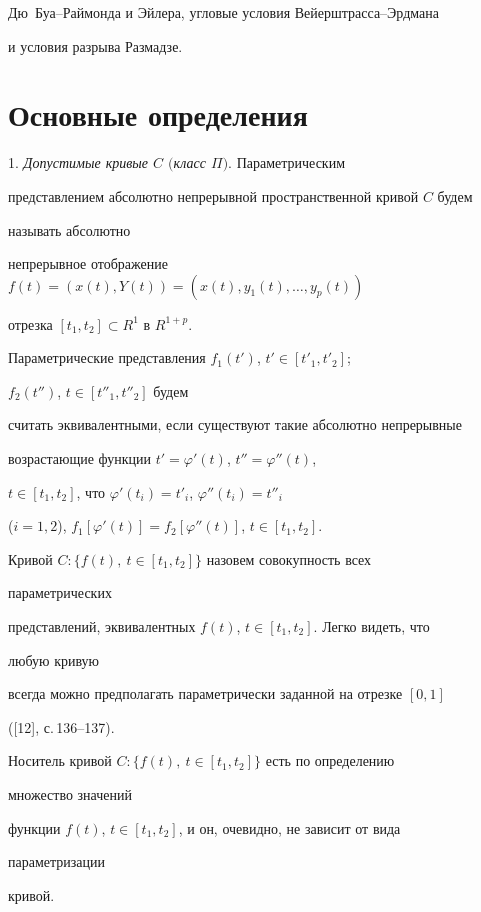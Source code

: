 Дю~Буа--Раймонда и Эйлера, угловые условия Вейерштрасса--Эрдмана 


и условия разрыва Размадзе. 


 


\section{Основные определения} 


 


1. {\it Допустимые кривые $C$ $($класс $\Pi)$}. Параметрическим 


представлением абсолютно непрерывной пространственной кривой $C$ будем 


называть абсолютно 


непрерывное отображение $f(t)=(x(t),Y(t))=(x(t),y_1(t),\dotsc,y_p(t))$ 


отрезка $[t_1,t_2]\subset R^1$ в $R^{1+p}$. 


Параметрические представления $f_1(t')$, $t'\in[t'_1,t'_2]$; 


$f_2(t'')$, $t\in[t''_1,t''_2]$ будем 


считать эквивалентными, если существуют такие абсолютно непрерывные 


возрастающие функции $t'=\varphi'(t)$, $t''=\varphi''(t)$, 


$t\in[t_1,t_2]$, что $\varphi'(t_i)=t'_i$, $\varphi''(t_i)=t''_i$ 


($i=1,2$), $f_1[\varphi'(t)]=f_2[\varphi''(t)]$, $t\in[t_1,t_2]$. 


Кривой $C:\{f(t),\ t\in[t_1,t_2]\}$ назовем совокупность всех 


параметрических 


представлений, эквивалентных $f(t)$, $t\in[t_1,t_2]$. Легко видеть, что 


любую кривую 


всегда можно предполагать параметрически заданной на отрезке $[0,1]$ 


([12], с.\,136--137). 


Носитель кривой $C:\{f(t),\ t\in[t_1,t_2]\}$ есть по определению 


множество значений 


функции $f(t)$, $t\in[t_1,t_2]$, и он, очевидно, не зависит от вида 


параметризации 


кривой. 


